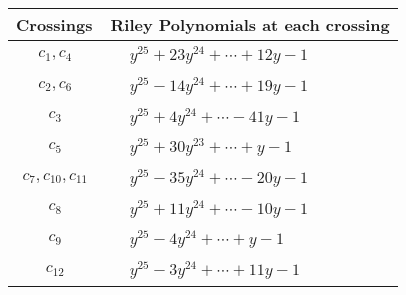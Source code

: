 \documentclass[1p]{elsarticle_modified}
\theoremstyle{definition}
\begin{document}
\begin{tabular}{m{50pt}|m{274pt}}
Crossings & \hspace{64pt}Riley Polynomials at each crossing \\
\hline $$\begin{aligned}c_{1},c_{4}\end{aligned}$$&$\begin{aligned}
&y^{25}+23 y^{24}+\cdots+12 y-1
\end{aligned}$\\
\hline $$\begin{aligned}c_{2},c_{6}\end{aligned}$$&$\begin{aligned}
&y^{25}-14 y^{24}+\cdots+19 y-1
\end{aligned}$\\
\hline $$\begin{aligned}c_{3}\end{aligned}$$&$\begin{aligned}
&y^{25}+4 y^{24}+\cdots-41 y-1
\end{aligned}$\\
\hline $$\begin{aligned}c_{5}\end{aligned}$$&$\begin{aligned}
&y^{25}+30 y^{23}+\cdots+y-1
\end{aligned}$\\
\hline $$\begin{aligned}c_{7},c_{10},c_{11}\end{aligned}$$&$\begin{aligned}
&y^{25}-35 y^{24}+\cdots-20 y-1
\end{aligned}$\\
\hline $$\begin{aligned}c_{8}\end{aligned}$$&$\begin{aligned}
&y^{25}+11 y^{24}+\cdots-10 y-1
\end{aligned}$\\
\hline $$\begin{aligned}c_{9}\end{aligned}$$&$\begin{aligned}
&y^{25}-4 y^{24}+\cdots+y-1
\end{aligned}$\\
\hline $$\begin{aligned}c_{12}\end{aligned}$$&$\begin{aligned}
&y^{25}-3 y^{24}+\cdots+11 y-1
\end{aligned}$\\
\hline
\end{tabular}\\~\\
\end{document}
